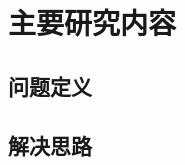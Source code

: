 \section{主要研究内容}
\subsection{问题定义}
\begin{frame}{\insertsection}{\insertsubsection}
\end{frame}
\subsection{解决思路}
\begin{frame}{\insertsection}{\insertsubsection}
\end{frame}

\begin{frame}{\insertsection}{\insertsubsection}
\end{frame}
